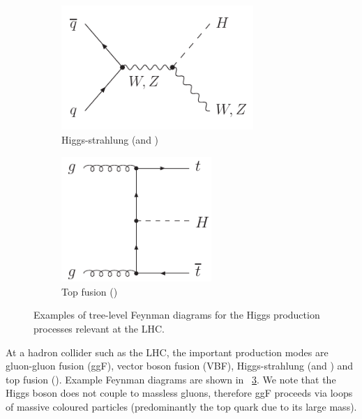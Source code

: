 \begin{figure}[b]
\begin{subfigure}[b]{0.4\textwidth}
	\end{subfigure}
	\hfill\null
	\\\bigskip
	\null\hfill
	\begin{subfigure}[b]{0.4\textwidth}
		\centering
		\includegraphics[width=0.8\textwidth]{axodraw/VH.pdf}
		\caption{Higgs-strahlung (\WH and \ZH)}
		\label{fig:feyn:VH}
	\end{subfigure}
	\hfill
	\begin{subfigure}[b]{0.4\textwidth}
		\centering
		\includegraphics[width=0.625\textwidth]{axodraw/ttH.pdf}
		\caption{Top fusion (\ttH)}
		\label{fig:feyn:ttH}
	\end{subfigure}
	\hfill\null
	\caption{Examples of tree-level Feynman diagrams for the Higgs production processes relevant at the LHC.}
	\label{fig:feyn}
\end{figure}

At a hadron collider such as the LHC, the important production modes are gluon-gluon 
fusion (ggF), vector boson fusion (VBF), Higgs-strahlung (\WH and \ZH) and top fusion 
(\ttH). Example Feynman diagrams are shown in \Figure~\ref{fig:feyn}. We note that the 
Higgs boson does not couple to massless gluons, therefore ggF proceeds via loops of 
massive coloured particles (predominantly the top quark due to its large mass). 

